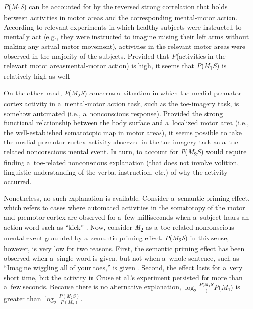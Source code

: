 \textit{P}(\textit{M}\textsubscript{1}{\textbar}\textit{S}) can be accounted for by the reversed strong correlation that holds between activities in motor areas and the corresponding mental-motor action. According to relevant experiments
\parencites[e.g.,][]{pfurtscheller_motor_1997}[][]{ehrsson_imagery_2003} %
 in which healthy subjects were instructed to mentally act (e.g., they were instructed to imagine raising their left arms without making any actual motor movement), activities in the relevant motor areas were observed in the majority of the subjects. Provided that \textit{P}(activities in the relevant motor areas{\textbar}mental-motor action) is high, it seems that \textit{P}(\textit{M}\textsubscript{1}{\textbar}\textit{S}) is relatively high as well.

On the other hand, \textit{P}(\textit{M}\textsubscript{2}{\textbar}\textit{S}) concerns a~situation in which the medial premotor cortex activity in a~mental-motor action task, such as the toe-imagery task, is somehow automated (i.e., a~nonconscious response). Provided the strong functional relationship between the body surface and a~localized motor area (i.e., the well-established somatotopic map in motor areas), it seems possible to take the medial premotor cortex activity observed in the toe-imagery task as a~toe-related nonconscious mental event. In turn, to account for \textit{P}(\textit{M}\textsubscript{2}{\textbar}\textit{S}) would require finding a~toe-related nonconscious explanation (that does not involve volition, linguistic understanding of the verbal instruction, etc.) of why the activity occurred.

Nonetheless, no such explanation is available. Consider a~semantic priming effect, which refers to cases where automated activities in the somatotopy of the motor and premotor cortex are observed for a~few milliseconds when a~subject hears an action-word such as ``kick''
\parencite[][]{pulvermuller_brain_2005}. %
 Now, consider \textit{M}\textsubscript{2} as a~toe-related nonconscious mental event grounded by a~semantic priming effect. \textit{P}(\textit{M}\textsubscript{2}{\textbar}\textit{S}) in this sense, however, is very low for two reasons. First, the semantic priming effect has been observed when a~single word is given, but not when a~whole sentence, such as ``Imagine wiggling all of your toes,'' is given 
\parencite[][]{raposo_modulation_2009}. %
 Second, the effect lasts for a~very short time, but the activity in Cruse et al.'s experiment persisted for more than a~few seconds. Because there is no alternative explanation, $\log _2\frac{P(M_1S}){P(M_1})$ is greater than $\log _2\frac{P(M_2S)}{P(M_2)}$.


